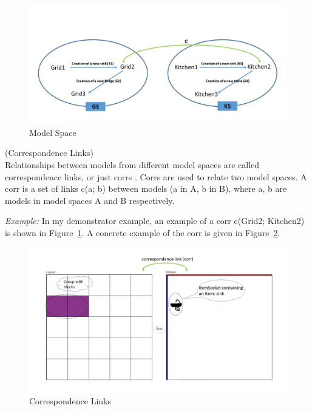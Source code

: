 \begin{figure}
	\includegraphics[width=1\textwidth]{figures/Model_Space}
	\caption{Model Space}
	\label{fig:Model_Space}
\end{figure}

\begin{defn}\label{defCorrespondenceLinks } (Correspondence Links)\\
Relationships between models from different model spaces are called correspondence links, or just corrs \cite{benchmarx-reload}. Corrs are used to relate two model spaces. A corr is a set of links c(a; b) between models (a in A, b in B), where  a, b are models in model spaces A and B respectively.
\end{defn}

\textit{Example:} In my demonstrator example, an example of a corr c(Grid2; Kitchen2) is shown in Figure~\ref{fig:Model_Space}. A concrete example of the corr is given in  Figure~\ref{fig:Correspondence_Links}.

\begin{figure}
	\includegraphics[width=1\textwidth]{figures/Corr}
	\caption{Correspondence Links}
	\label{fig:Correspondence_Links}
\end{figure}

